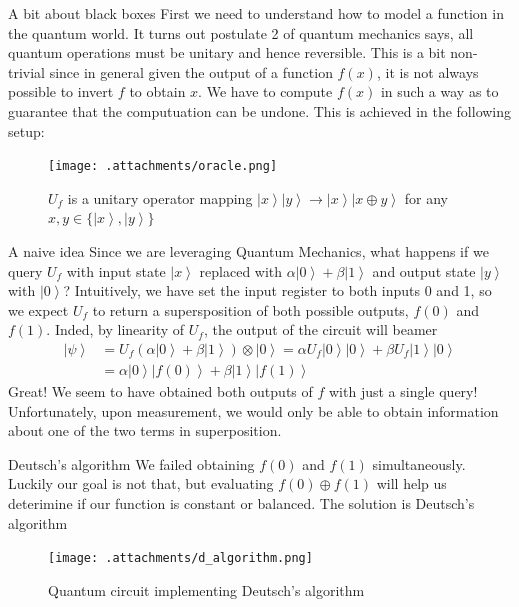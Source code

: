 \documentclass{beamer}
\newcommand{\ket}[1]{\left| #1 \right>} %
\begin{document}
\begin{frame}{A bit about black boxes}
	\justifying
	First we need to understand how to model a function in the quantum world. It turns out postulate 2 of quantum mechanics says, all quantum operations must be unitary and hence reversible.
	\newline
	\newline
	This is a bit non-trivial since in general given the output of a function $f(x)$, it is not always possible to invert $f$ to obtain $x$. We have to compute $f(x)$ in such a way as to guarantee that the computuation can be undone. This is achieved in the following setup:
	\begin{figure}
		\texttt{[image: .attachments/oracle.png]}
		\caption{$U_f$ is a unitary operator mapping $\ket x \ket y \rightarrow \ket x \ket {x \oplus y}$ for any $x,y \in \{\ket x, \ket y \}$} 
	\end{figure}
\end{frame}

\begin{frame}{A naive idea}
	\justifying
	Since we are leveraging Quantum Mechanics, what happens if we query $U_f$ with input state $\ket x$ replaced with  $\alpha \ket 0 + \beta \ket 1$ and output state $\ket y$ with $\ket 0$?
	\newline
	\newline
	Intuitively, we have set the input register to both inputs 0 and 1, so we expect $U_f$ to return a supersposition of both possible outputs, $f(0)$ and $f(1)$. Inded, by linearity of $U_f$, the output of the circuit will beamer
	\begin{align}
	\ket {\psi} &= U_f(\alpha \ket 0 + \beta \ket 1) \otimes \ket 0 = \alpha U_f \ket 0 \ket 0 + \beta U_f \ket 1 \ket 0 \nonumber \\
	&= \alpha \ket 0 \ket {f(0)} +  \beta \ket 1 \ket {f(1)} \nonumber
	\end{align}
	Great! We seem to have obtained both outputs of $f$ with just a single query! Unfortunately, upon measurement, we would only be able to obtain information about one of the two terms in superposition.
\end{frame}

\begin{frame}{Deutsch's algorithm}
	\justifying
	We failed obtaining $f(0)$ and $f(1)$ simultaneously. Luckily our goal is not that, but evaluating $f(0) \oplus f(1)$ will help us deterimine if our function is constant or balanced. The solution is Deutsch's algorithm
	\begin{figure}
		\texttt{[image: .attachments/d\_algorithm.png]}
		\caption{Quantum circuit implementing Deutsch's algorithm}
	\end{figure}
\end{frame}
\end{document}
